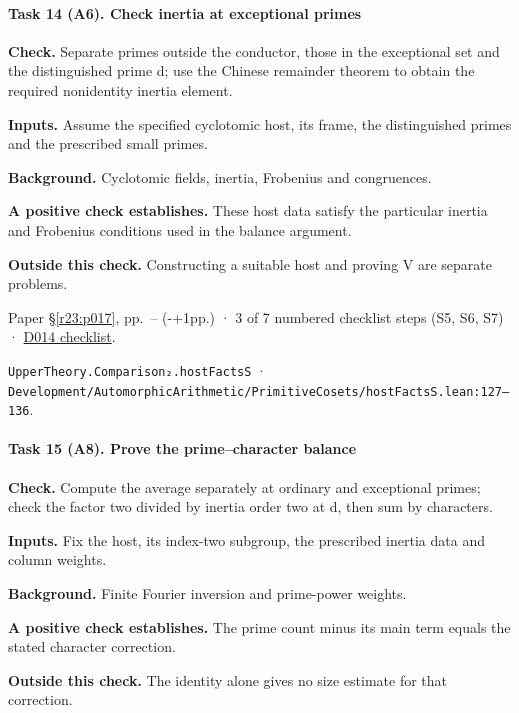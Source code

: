 \paragraph{Task 14 (A6). Check inertia at exceptional primes}\label{v7:task-14}

\textbf{Check.} Separate primes outside the conductor, those in the exceptional set and the distinguished prime d; use the Chinese remainder theorem to obtain the required nonidentity inertia element.

\textbf{Inputs.} Assume the specified cyclotomic host, its frame, the distinguished primes and the prescribed small primes.

\textbf{Background.} Cyclotomic fields, inertia, Frobenius and congruences.

\textbf{A positive check establishes.} These host data satisfy the particular inertia and Frobenius conditions used in the balance argument.

\textbf{Outside this check.} Constructing a suitable host and proving V are separate problems.

Paper \S\ref{r23:p017}, pp.\ \pageref{r24:hostfacts}--\pageref{v5:hostfacts-end} (\number\numexpr{}-+1\relax pp.) · 3 of 7 numbered checklist steps (S5, S6, S7) · \href{https://github.com/GunheeC/rh-lean-verification-atlas/blob/v0.1.0/units/D014.check.md}{D014 checklist}.

\nolinkurl{UpperTheory.Comparison₂.hostFactsS} · \nolinkurl{Development/AutomorphicArithmetic/PrimitiveCosets/hostFactsS.lean:127–136}.

\paragraph{Task 15 (A8). Prove the prime–character balance}\label{v7:task-15}

\textbf{Check.} Compute the average separately at ordinary and exceptional primes; check the factor two divided by inertia order two at d, then sum by characters.

\textbf{Inputs.} Fix the host, its index-two subgroup, the prescribed inertia data and column weights.

\textbf{Background.} Finite Fourier inversion and prime-power weights.

\textbf{A positive check establishes.} The prime count minus its main term equals the stated character correction.

\textbf{Outside this check.} The identity alone gives no size estimate for that correction.

